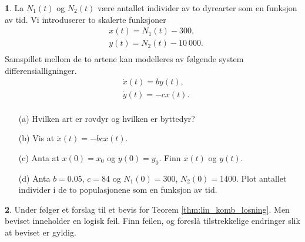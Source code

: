 \documentclass{article}
\theoremstyle{definition}
\newtheorem{oppg}{}
\theoremstyle{remark}
\begin{document}
\begin{multicols*}{2}
\begin{oppg}  
  La $N_1(t)$ og $N_2(t)$ være antallet individer av to dyrearter som en funksjon av tid. Vi introduserer to skalerte funksjoner
  \begin{equation*}
    \begin{split}
      & x(t) = N_1(t) - 300, \\
      & y(t) = N_2(t) - 10\ 000. \\
    \end{split}
  \end{equation*}
  Samspillet mellom de to artene kan modelleres av følgende system differensialligninger.
    \begin{equation*}
      \begin{split}
        & \dot{x}(t) = by(t), \\
        & \dot{y}(t) = -cx(t). \\
      \end{split}
    \end{equation*}
  \begin{itemize}
    \item[(a)] Hvilken art er rovdyr og hvilken er byttedyr?
    \item[(b)] Vis at $\ddot{x}(t) = -bc x(t)$.
    \item[(c)] Anta at $x(0) = x_0$ og $y(0) = y_0$. Finn $x(t)$ og $y(t)$.
    \item[(d)] Anta $b=0.05$, $c=84$ og $N_1(0) = 300$, $N_2(0) = 1400$. Plot antallet individer i de to populasjonene som en funksjon av tid.
  \end{itemize}
\end{oppg}

\begin{oppg} \label{oppg:bevis}
  Under følger et forslag til et bevis for Teorem \ref{thm:lin_komb_losning}. Men beviset inneholder en logisk feil. Finn feilen, og foreslå tilstrekkelige endringer slik at beviset er gyldig.
\end{oppg}


\end{multicols*}
\end{document}
